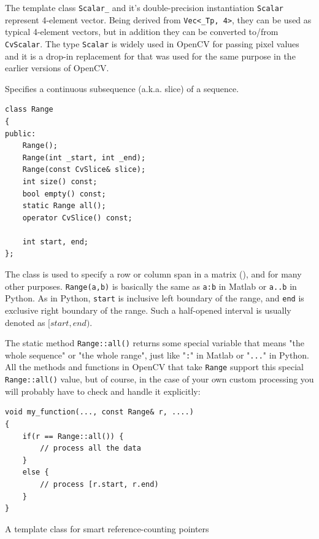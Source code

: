 The template class \texttt{Scalar\_} and it's double-precision instantiation \texttt{Scalar} represent 4-element vector. Being derived from \texttt{Vec<\_Tp, 4>}, they can be used as typical 4-element vectors, but in addition they can be converted to/from \texttt{CvScalar}. The type \texttt{Scalar} is widely used in OpenCV for passing pixel values and it is a drop-in replacement for  that was used for the same purpose in the earlier versions of OpenCV.

\label{Range}
Specifies a continuous subsequence (a.k.a. slice) of a sequence.

\begin{lstlisting}
class Range
{
public:
    Range();
    Range(int _start, int _end);
    Range(const CvSlice& slice);
    int size() const;
    bool empty() const;
    static Range all();
    operator CvSlice() const;

    int start, end;
};
\end{lstlisting}

The class is used to specify a row or column span in a matrix (), and for many other purposes. \texttt{Range(a,b)} is basically the same as \texttt{a:b} in Matlab or \texttt{a..b} in Python. As in Python, \texttt{start} is inclusive left boundary of the range, and \texttt{end} is exclusive right boundary of the range. Such a half-opened interval is usually denoted as $[start,end)$.

The static method \texttt{Range::all()} returns some special variable that means "the whole sequence" or "the whole range", just like "\texttt{:}" in Matlab or "\texttt{...}" in Python. All the methods and functions in OpenCV that take \texttt{Range} support this special \texttt{Range::all()} value, but of course, in the case of your own custom processing you will probably have to check and handle it explicitly:
\begin{lstlisting}
void my_function(..., const Range& r, ....)
{
    if(r == Range::all()) {
        // process all the data
    }
    else {
        // process [r.start, r.end)
    } 
}
\end{lstlisting}

\label{Ptr}

A template class for smart reference-counting pointers

